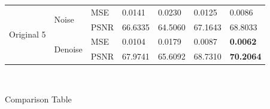 \begin{center}
\begin{tabular}{llllllllllll|l|l|l|l|l|l|l|l|l|l|l|l|l|}
\multicolumn{4}{|l|}{\multirow{4}{*}{Original 5}} & \multicolumn{4}{l|}{\multirow{2}{*}{Noise}}   & \multicolumn{4}{l|}{MSE}  & \multicolumn{3}{l|}{0.0141}  & \multicolumn{3}{l|}{0.0230}  & \multicolumn{4}{l|}{0.0125}   & \multicolumn{3}{l|}{0.0086}           \\ \cline{9-25} 
\multicolumn{4}{|l|}{}                            & \multicolumn{4}{l|}{}                         & \multicolumn{4}{l|}{PSNR} & \multicolumn{3}{l|}{66.6335} & \multicolumn{3}{l|}{64.5060} & \multicolumn{4}{l|}{67.1643}  & \multicolumn{3}{l|}{68.8033}          \\ \cline{5-25} 
\multicolumn{4}{|l|}{}                            & \multicolumn{4}{l|}{\multirow{2}{*}{Denoise}} & \multicolumn{4}{l|}{MSE}  & \multicolumn{3}{l|}{0.0104}  & \multicolumn{3}{l|}{0.0179}  & \multicolumn{4}{l|}{0.0087}   & \multicolumn{3}{l|}{\textbf{0.0062}}  \\ \cline{9-25} 
\multicolumn{4}{|l|}{}                            & \multicolumn{4}{l|}{}                         & \multicolumn{4}{l|}{PSNR} & \multicolumn{3}{l|}{67.9741} & \multicolumn{3}{l|}{65.6092} & \multicolumn{4}{l|}{68.7310}  & \multicolumn{3}{l|}{\textbf{70.2064}} \\ \hline
\end{tabular}

\

Comparison Table
\end{center}


\newpage

